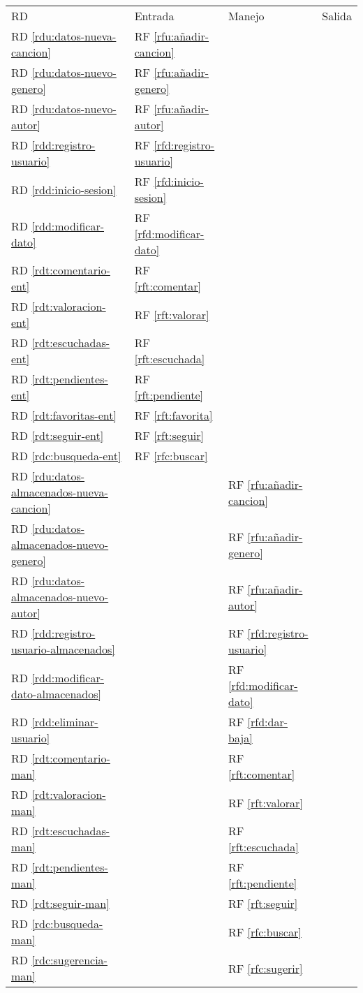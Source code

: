 \documentclass[
  12pt,
  a4paper,
  DIV=12,
  spanish,
]{scrartcl}
\newcounter{RF}
\newcounter{RD}
\begin{document}
\begin{tabularx}{\textwidth}{l|XXX}
  RD & Entrada & Manejo & Salida \\
  RD \ref{rdu:datos-nueva-cancion} & RF \ref{rfu:añadir-cancion} & & \\
  RD \ref{rdu:datos-nuevo-genero} & RF \ref{rfu:añadir-genero} & & \\
  RD \ref{rdu:datos-nuevo-autor} & RF \ref{rfu:añadir-autor} \\
  RD \ref{rdd:registro-usuario} & RF \ref{rfd:registro-usuario} & & \\
  RD \ref{rdd:inicio-sesion} & RF \ref{rfd:inicio-sesion} & & \\
  RD \ref{rdd:modificar-dato} & RF \ref{rfd:modificar-dato} & & \\
  RD \ref{rdt:comentario-ent} & RF \ref{rft:comentar} & & \\
  RD \ref{rdt:valoracion-ent} & RF \ref{rft:valorar} & & \\
  RD \ref{rdt:escuchadas-ent} & RF \ref{rft:escuchada} & & \\
  RD \ref{rdt:pendientes-ent} & RF \ref{rft:pendiente} & & \\
  RD \ref{rdt:favoritas-ent} & RF \ref{rft:favorita} & & \\
  RD \ref{rdt:seguir-ent} & RF \ref{rft:seguir} & & \\
  RD \ref{rdc:busqueda-ent} & RF \ref{rfc:buscar} & & \\

  RD \ref{rdu:datos-almacenados-nueva-cancion} & & RF \ref{rfu:añadir-cancion} & \\
  RD \ref{rdu:datos-almacenados-nuevo-genero} & & RF \ref{rfu:añadir-genero} & \\
  RD \ref{rdu:datos-almacenados-nuevo-autor} & & RF \ref{rfu:añadir-autor} & \\


  RD \ref{rdd:registro-usuario-almacenados} & & RF \ref{rfd:registro-usuario} & \\
  RD \ref{rdd:modificar-dato-almacenados} & & RF \ref{rfd:modificar-dato} & \\
  RD \ref{rdd:eliminar-usuario} & & RF \ref{rfd:dar-baja} & \\
  RD \ref{rdt:comentario-man} & & RF \ref{rft:comentar} & \\
  RD \ref{rdt:valoracion-man} & & RF \ref{rft:valorar} & \\
  RD \ref{rdt:escuchadas-man} & & RF \ref{rft:escuchada} & \\
  RD \ref{rdt:pendientes-man} & & RF \ref{rft:pendiente} & \\
  RD \ref{rdt:seguir-man} & & RF \ref{rft:seguir} & \\
  RD \ref{rdc:busqueda-man} && RF \ref{rfc:buscar} & \\
  RD \ref{rdc:sugerencia-man} && RF \ref{rfc:sugerir} & \\


\end{tabularx}
\end{document}
